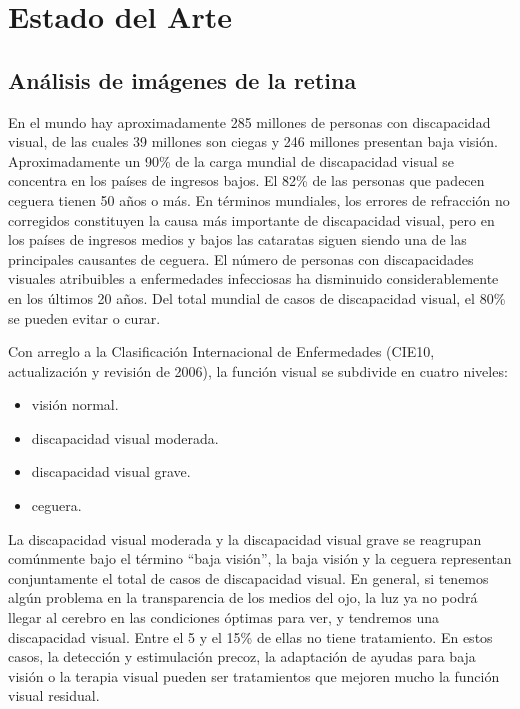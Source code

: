 \chapter{Estado del Arte} %

\label{Chapter2} %


\section{An\'alisis de im\'agenes de la retina}

En el mundo hay aproximadamente 285 millones \cite{oms:cifras} de personas con discapacidad visual, de las cuales 39 millones son ciegas y 246 millones presentan baja visi\'on. Aproximadamente un 90\% de la carga mundial de discapacidad visual se concentra en los pa\'ises de ingresos bajos.
El 82\% de las personas que padecen ceguera tienen 50 años o m\'as. En t\'erminos mundiales, los errores de refracci\'on no corregidos constituyen la causa m\'as importante de discapacidad visual, pero en los pa\'ises de ingresos medios y bajos las cataratas siguen siendo una de las principales causantes de ceguera. El n\'umero de personas con discapacidades visuales atribuibles a enfermedades infecciosas ha disminuido considerablemente en los \'ultimos 20 años. Del total mundial de casos de discapacidad visual, el 80\%  se pueden evitar o curar.

Con arreglo a la Clasificaci\'on Internacional de Enfermedades (CIE10, actualizaci\'on y revisi\'on de 2006), la funci\'on visual se subdivide en cuatro niveles:
\begin{itemize}
\item visi\'on normal.
\item discapacidad visual moderada.
\item discapacidad visual grave.
\item ceguera.
\end{itemize}
La discapacidad visual moderada y la discapacidad visual grave se reagrupan com\'unmente bajo el t\'ermino “baja visi\'on”, la baja visi\'on y la ceguera representan conjuntamente el total de casos de discapacidad visual. En general, si tenemos alg\'un problema en la transparencia de los medios del ojo, la luz ya no podr\'a llegar al cerebro en las condiciones \'optimas para ver, y tendremos una discapacidad visual.
Entre el 5 y el 15\% de ellas no tiene tratamiento. En estos casos, la detecci\'on y estimulaci\'on precoz, la adaptaci\'on de ayudas para baja visi\'on o la terapia visual pueden ser tratamientos que mejoren mucho la funci\'on visual residual.

